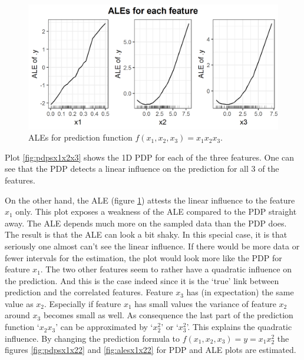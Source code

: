 \documentclass[
]{krantz}
\begin{document}
\begin{figure}
\includegraphics[width=1\linewidth]{images/ale_1_ALEs_x1x2x3_150_0_0p5_2_2} \caption{ALEs for prediction function \(f(x_1, x_2, x_3) = x_1 x_2 x_3\).}\label{fig:alesx1x2x3}
\end{figure}



Plot \ref{fig:pdpsx1x2x3} shows the 1D PDP for each of the three features. One can see that the PDP detects a linear influence on the prediction for all 3 of the features.

On the other hand, the ALE (figure \ref{fig:alesx1x2x3}) attests the linear influence to the feature \(x_1\) only. This plot exposes a weakness of the ALE compared to the PDP straight away. The ALE depends much more on the sampled data than the PDP does. The result is that the ALE can look a bit shaky. In this special case, it is that seriously one almost can't see the linear influence. If there would be more data or fewer intervals for the estimation, the plot would look more like the PDP for feature \(x_1\). The two other features seem to rather have a quadratic influence on the prediction. And this is the case indeed since it is the `true' link between prediction and the correlated features. Feature \(x_3\) has (in expectation) the same value as \(x_2\). Especially if feature \(x_1\) has small values the variance of feature \(x_2\) around \(x_3\) becomes small as well. As consequence the last part of the prediction function `\(x_2 x_3\)' can be approximated by `\(x_2^2\)' or `\(x_3^2\)'. This explains the quadratic influence. By changing the prediction formula to \(f(x_1, x_2, x_3) = y = x_1 x_2^2\) the figures \ref{fig:pdpsx1x22} and \ref{fig:alesx1x22} for PDP and ALE plots are estimated.
\end{document}
